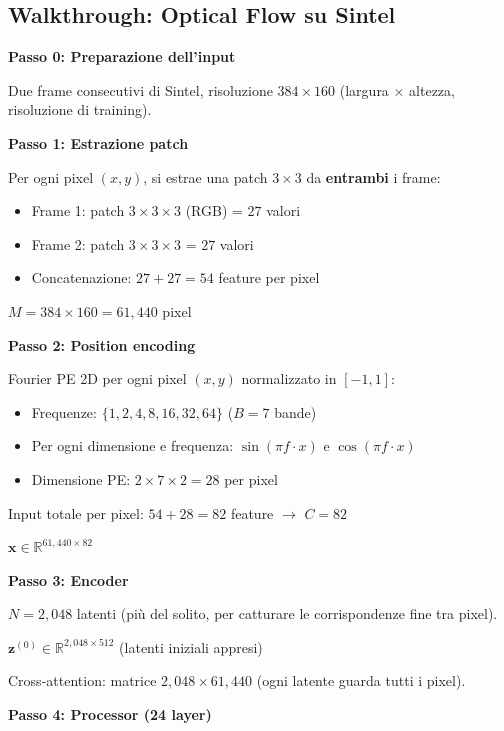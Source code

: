 \documentclass[12pt,a4paper]{article}
\begin{document}
\subsection{Walkthrough: Optical Flow su Sintel}

\begin{examplebox}
\textbf{Passo 0: Preparazione dell'input}

Due frame consecutivi di Sintel, risoluzione $384 \times 160$ (largura $\times$ altezza, risoluzione di training).

\textbf{Passo 1: Estrazione patch}

Per ogni pixel $(x, y)$, si estrae una patch $3 \times 3$ da \textbf{entrambi} i frame:
\begin{itemize}
    \item Frame 1: patch $3 \times 3 \times 3$ (RGB) = $27$ valori
    \item Frame 2: patch $3 \times 3 \times 3$ = $27$ valori
    \item Concatenazione: $27 + 27 = 54$ feature per pixel
\end{itemize}

$M = 384 \times 160 = 61{,}440$ pixel

\textbf{Passo 2: Position encoding}

Fourier PE 2D per ogni pixel $(x, y)$ normalizzato in $[-1, 1]$:
\begin{itemize}
    \item Frequenze: $\{1, 2, 4, 8, 16, 32, 64\}$ ($B = 7$ bande)
    \item Per ogni dimensione e frequenza: $\sin(\pi f \cdot x)$ e $\cos(\pi f \cdot x)$
    \item Dimensione PE: $2 \times 7 \times 2 = 28$ per pixel
\end{itemize}

Input totale per pixel: $54 + 28 = 82$ feature $\to$ $C = 82$

$\mathbf{x} \in \mathbb{R}^{61{,}440 \times 82}$

\textbf{Passo 3: Encoder}

$N = 2{,}048$ latenti (pi\`u del solito, per catturare le corrispondenze fine tra pixel).

$\mathbf{z}^{(0)} \in \mathbb{R}^{2{,}048 \times 512}$ (latenti iniziali appresi)

Cross-attention: matrice $2{,}048 \times 61{,}440$ (ogni latente guarda tutti i pixel).

\textbf{Passo 4: Processor (24 layer)}


\end{examplebox}
\end{document}
